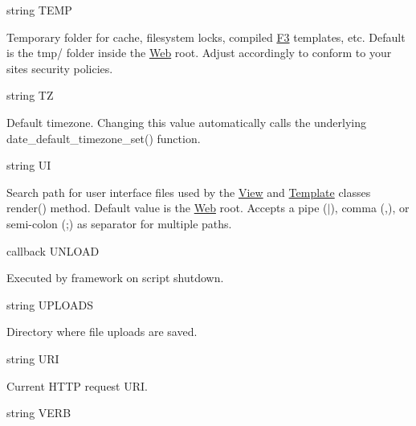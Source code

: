 {\ttfamily string T\+E\+MP}


\begin{DoxyItemize}
\item Temporary folder for cache, filesystem locks, compiled \hyperlink{class_f3}{F3} templates, etc. Default is the {\ttfamily tmp/} folder inside the \hyperlink{class_web}{Web} root. Adjust accordingly to conform to your site\textquotesingle{}s security policies.
\end{DoxyItemize}

{\ttfamily string TZ}


\begin{DoxyItemize}
\item Default timezone. Changing this value automatically calls the underlying {\ttfamily date\+\_\+default\+\_\+timezone\+\_\+set()} function.
\end{DoxyItemize}

{\ttfamily string UI}


\begin{DoxyItemize}
\item Search path for user interface files used by the {\ttfamily \hyperlink{class_view}{View}} and {\ttfamily \hyperlink{class_template}{Template}} classes\textquotesingle{} {\ttfamily render()} method. Default value is the \hyperlink{class_web}{Web} root. Accepts a pipe ({\ttfamily $\vert$}), comma ({\ttfamily ,}), or semi-\/colon ({\ttfamily ;}) as separator for multiple paths.
\end{DoxyItemize}

{\ttfamily callback U\+N\+L\+O\+AD}


\begin{DoxyItemize}
\item Executed by framework on script shutdown.
\end{DoxyItemize}

{\ttfamily string U\+P\+L\+O\+A\+DS}


\begin{DoxyItemize}
\item Directory where file uploads are saved.
\end{DoxyItemize}

{\ttfamily string U\+RI}


\begin{DoxyItemize}
\item Current H\+T\+TP request U\+RI.
\end{DoxyItemize}

{\ttfamily string V\+E\+RB}


